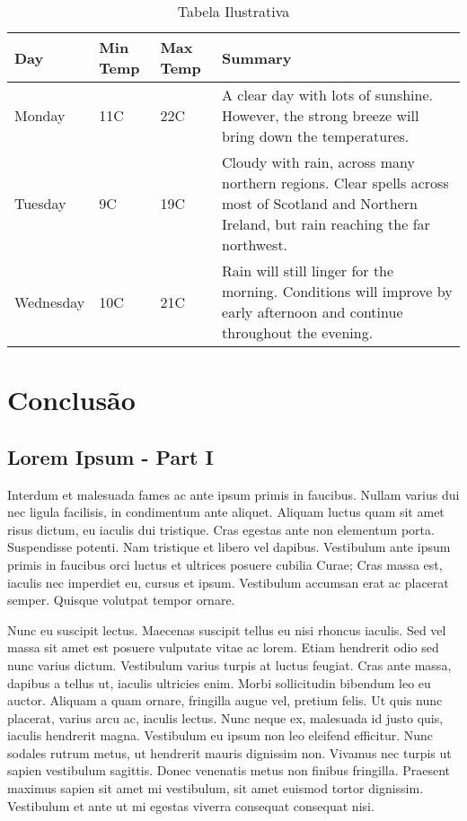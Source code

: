 \documentclass[
	12pt,				%
    oneside,			%
	a4paper,			%
	english,			%
	french,				%
	spanish,			%
	brazil				%
	]{abntex2}
\begin{document}
\begin{table}[h]
    \begin{center}    
    \begin{tabular}{ | l | l | l | p{5cm} |}
    \hline
    Day & Min Temp & Max Temp & Summary \\ \hline
    Monday & 11C & 22C & A clear day with lots of sunshine.
    However, the strong breeze will bring down the temperatures. \\ \hline
    Tuesday & 9C & 19C & Cloudy with rain, across many northern regions. Clear spells
    across most of Scotland and Northern Ireland,
    but rain reaching the far northwest. \\ \hline
    Wednesday & 10C & 21C & Rain will still linger for the morning.
    Conditions will improve by early afternoon and continue
    throughout the evening. \\
    \hline
    \end{tabular}
    \caption[Tabela Ilustrativa]{Tabela Ilustrativa }
    \label{tab1}
    \end{center}
\end{table}


\chapter{Conclusão}

\section{Lorem Ipsum - Part I}

Interdum et malesuada fames ac ante ipsum primis in faucibus. Nullam varius dui nec ligula facilisis, in condimentum ante aliquet. Aliquam luctus quam sit amet risus dictum, eu iaculis dui tristique. Cras egestas ante non elementum porta. Suspendisse potenti. Nam tristique et libero vel dapibus. Vestibulum ante ipsum primis in faucibus orci luctus et ultrices posuere cubilia Curae; Cras massa est, iaculis nec imperdiet eu, cursus et ipsum. Vestibulum accumsan erat ac placerat semper. Quisque volutpat tempor ornare.

Nunc eu suscipit lectus. Maecenas suscipit tellus eu nisi rhoncus iaculis. Sed vel massa sit amet est posuere vulputate vitae ac lorem. Etiam hendrerit odio sed nunc varius dictum. Vestibulum varius turpis at luctus feugiat. Cras ante massa, dapibus a tellus ut, iaculis ultricies enim. Morbi sollicitudin bibendum leo eu auctor. Aliquam a quam ornare, fringilla augue vel, pretium felis. Ut quis nunc placerat, varius arcu ac, iaculis lectus. Nunc neque ex, malesuada id justo quis, iaculis hendrerit magna. Vestibulum eu ipsum non leo eleifend efficitur. Nunc sodales rutrum metus, ut hendrerit mauris dignissim non. Vivamus nec turpis ut sapien vestibulum sagittis. Donec venenatis metus non finibus fringilla. Praesent maximus sapien sit amet mi vestibulum, sit amet euismod tortor dignissim. Vestibulum et ante ut mi egestas viverra consequat consequat nisi.
\end{document}
